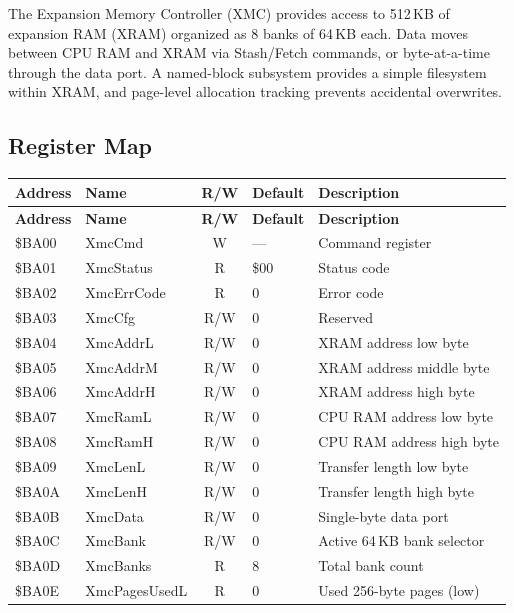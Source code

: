 The Expansion Memory Controller (XMC) provides access to 512\,KB of
expansion RAM (XRAM) organized as 8 banks of 64\,KB each.  Data moves
between CPU RAM and XRAM via Stash/Fetch commands, or byte-at-a-time
through the data port.  A named-block subsystem provides a simple filesystem
within XRAM, and page-level allocation tracking prevents accidental
overwrites.

\subsection{Register Map}

\begin{center}
\small
\begin{longtable}{@{}llcll@{}}
\toprule
\textbf{Address} & \textbf{Name} & \textbf{R/W} & \textbf{Default} & \textbf{Description} \\
\midrule
\endfirsthead
\toprule
\textbf{Address} & \textbf{Name} & \textbf{R/W} & \textbf{Default} & \textbf{Description} \\
\midrule
\endhead
\$BA00 & XmcCmd       & W   & ---  & Command register \\
\$BA01 & XmcStatus    & R   & \$00 & Status code \\
\$BA02 & XmcErrCode   & R   & 0    & Error code \\
\$BA03 & XmcCfg       & R/W & 0    & Reserved \\
\$BA04 & XmcAddrL     & R/W & 0    & XRAM address low byte \\
\$BA05 & XmcAddrM     & R/W & 0    & XRAM address middle byte \\
\$BA06 & XmcAddrH     & R/W & 0    & XRAM address high byte \\
\$BA07 & XmcRamL      & R/W & 0    & CPU RAM address low byte \\
\$BA08 & XmcRamH      & R/W & 0    & CPU RAM address high byte \\
\$BA09 & XmcLenL      & R/W & 0    & Transfer length low byte \\
\$BA0A & XmcLenH      & R/W & 0    & Transfer length high byte \\
\$BA0B & XmcData      & R/W & 0    & Single-byte data port \\
\$BA0C & XmcBank      & R/W & 0    & Active 64\,KB bank selector \\
\$BA0D & XmcBanks     & R   & 8    & Total bank count \\
\$BA0E & XmcPagesUsedL & R  & 0    & Used 256-byte pages (low) \\

\end{longtable}
\end{center}
